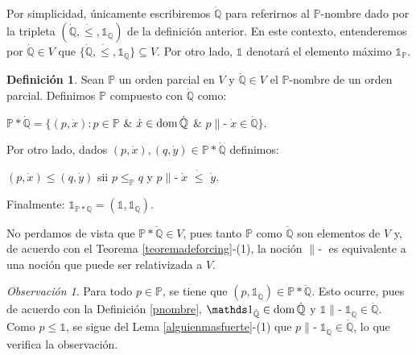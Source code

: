 \documentclass[11pt]{unam_tesis1}
\theoremstyle{MyThmStyle}
\theoremstyle{definition}
\newtheorem{definition}{Definici\'on}[chapter]
\theoremstyle{plain}
\theoremstyle{remark}
\newtheorem*{remark}{Observaci\'on}
\def\dom{\mathop{\rm dom}\nolimits}
\def\forces{\mathop{\parallel\!\!\!-}\nolimits}
\let\Vdash\forces
\let\leq\leqslant
\begin{document}
Por simplicidad, \'unicamente escribiremos $\dot{\mathbb Q}$ para referirnos al $\mathbb P$-nombre dado por la tripleta $(\dot{\mathbb Q},\dot{\leq}, \mathds 1_{\dot{\mathbb Q}})$ de la definici\'on anterior. En este contexto, entenderemos por $\dot{\mathbb Q}\in V$ que $\{\dot{\mathbb Q},\dot{\leq}, \mathds 1_{\dot{\mathbb Q}} \}\subseteq V$. Por otro lado, $\mathds 1$ denotar\'a el elemento m\'aximo $\mathds 1_{\mathbb P}$.

\begin{definition}\label{composicion}
Sean $\mathbb P$ un orden parcial en $V$ y $\dot {\mathbb Q}\in V$ el $\mathbb P$-nombre de un orden parcial. Definimos $\mathbb P$ compuesto con $\dot{\mathbb Q}$ como:

\begin{center}
$\mathbb P* \dot {\mathbb Q}=\{ (p, \dot x): p\in \mathbb P$ $\&$  $\dot x \in \dom \dot {\mathbb Q}$ $\&$ $p\Vdash \dot x \in \dot {\mathbb Q} \}$.
\end{center}

Por otro lado, dados $(p,\dot x), (q,\dot y) \in \mathbb P*\dot{\mathbb Q}$ definimos:

\begin{center}
$(p,\dot{x})\leq (q,\dot{y})$ sii $p\leq_{\mathbb P} q$ y $p\Vdash \dot{x}$ $\dot{\leq}$ $\dot{y}$.
\end{center}

Finalmente: $\mathds {1}_{\mathbb P*\dot{\mathbb Q}}=(\mathds{1},\mathds{1}_{\dot{\mathbb Q}})$.

\end{definition}

No perdamos de vista que $\mathbb P*\dot{\mathbb Q}\in V$, pues tanto $\mathbb P$ como $\dot {\mathbb Q}$ son elementos de $V$ y, de acuerdo con el Teorema \ref{teoremadeforcing}-(1), la noci\'on $\Vdash$ es equivalente a una noci\'on que puede ser relativizada a $V$.

\begin{remark}
Para todo $p\in \mathbb P$, se tiene que $(p,\mathds 1_{\dot{\mathbb Q}})\in \mathbb P*\dot{\mathbb Q}$. Esto ocurre, pues de acuerdo con la Definici\'on \ref{pnombre}, $\mathds 1_{\dot{\mathbb Q}}\in \dom \dot{\mathbb Q}$ y $\mathds 1\Vdash \mathds 1_{\dot{\mathbb Q}}\in \dot{\mathbb Q}$. Como $p\leq \mathds 1$, se sigue del Lema \ref{alguienmasfuerte}-(1) que $p\Vdash \mathds{1}_{\dot{\mathbb Q}}\in \dot{\mathbb Q}$, lo que verifica la observaci\'on.

\end{remark}
\end{document}
